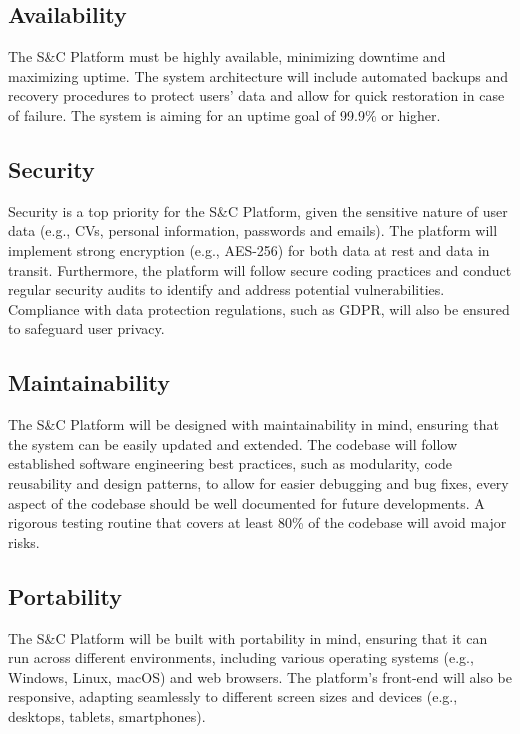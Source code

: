 \subsection{Availability}
The S\&C Platform must be highly available, 
minimizing downtime and maximizing uptime. 
The system architecture will include automated backups and recovery procedures to protect users' data 
and allow for quick restoration in case of failure. 
The system is aiming for an uptime goal of 99.9\% or higher.

\subsection{Security}
Security is a top priority for the S\&C Platform, 
given the sensitive nature of user data (e.g., CVs, personal information, passwords and emails). 
The platform will implement strong encryption (e.g., AES-256) 
for both data at rest and data in transit. 
Furthermore, the platform will follow secure coding practices 
and conduct regular security audits to identify and address potential vulnerabilities. 
Compliance with data protection regulations, such as GDPR, will also be ensured to safeguard user privacy.

\subsection{Maintainability}
The S\&C Platform will be designed with maintainability in mind, 
ensuring that the system can be easily updated and extended. 
The codebase will follow established software engineering best practices, 
such as modularity, code reusability and design patterns, to allow for easier debugging and bug fixes, 
every aspect of the codebase should be well documented for future developments.  
A rigorous testing routine that covers at least 80\% of the codebase will avoid major risks.

\subsection{Portability}
The S\&C Platform will be built with portability in mind, 
ensuring that it can run across different environments, 
including various operating systems (e.g., Windows, Linux, macOS) and web browsers. 
The platform’s front-end will also be responsive, 
adapting seamlessly to different screen sizes and devices (e.g., desktops, tablets, smartphones).
